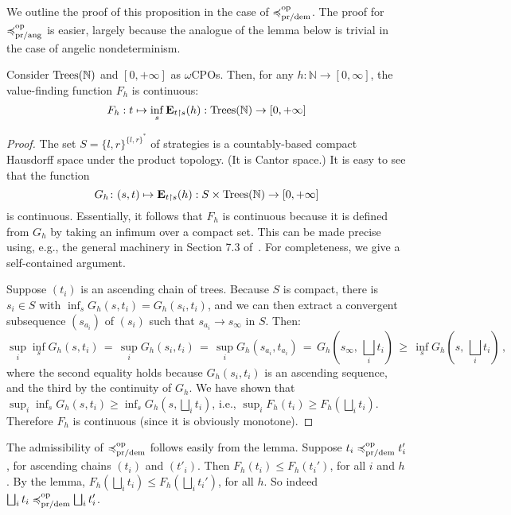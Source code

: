 We outline the proof of this proposition in the case of $\preccurlyeq^{\text{op}}_{\text{pr/dem}}$. The proof for  $\preccurlyeq^{\text{op}}_{\text{pr/ang}}$ is easier, largely because the analogue of the lemma below is trivial in the case of angelic nondeterminism.
\begin{lemma} 
\label{lemma:F-continuous}
Consider $\textnormal{Trees}(\mathbb{N})$ and $[0,+\infty]$ as $\omega$CPOs. Then,
for any $h \colon \mathbb{N} \to [0,\infty]$, 
the value-finding function $F_h$ is continuous:
\[F_h : t \mapsto \inf_s  \mathbf{E}_{t\restriction s} (h) : \textnormal{Trees}(\mathbb{N}) \to [0,+\infty]\]
\end{lemma}
\begin{proof}
The set $S = \{l,r\}^{\{l,r\}^*}$ of strategies is a countably-based compact Hausdorff space under the product topology. (It is Cantor space.)
It is easy to see that  the function 
\[G_h \colon (s,t) \mapsto \mathbf{E}_{t\restriction s} (h) : S \times \textnormal{Trees}(\mathbb{N})  \to [0,+\infty] \]
is continuous.
Essentially, it follows that $F_h$ is continuous because it is defined from $G_h$ by taking an infimum over a compact set. 
This can be made precise using, e.g.,  the general machinery in Section 7.3 of~\cite{AndreaShalk}. For completeness, we give a self-contained argument. 

Suppose $(t_i)$ is an ascending chain of trees.
Because $S$ is compact,  there is $s_i \in S$ with $\inf_s G_h(s,t_i) = G_h(s_i, t_i)$,
and we can then extract a convergent 
subsequence  $(s_{a_i})$ of $(s_i)$ such that $s_{a_i} \rightarrow s_\infty$ in $S$. Then:
\begin{equation*}
                \sup_i \inf_s G_h(s,t_i)
                \, =\, 
                \sup_i G_h(s_i, t_i)
                \, = \,
                \sup_i G_h(s_{a_i}, t_{a_i})
                \, = \,
                G_h(s_\infty, \, \bigsqcup_i t_i)
                \, \geq \,
                \inf_s  G_h(s, \, \bigsqcup_i t_i)\, ,
            \end{equation*}
where the second equality holds because $G_h(s_i, t_i)$ is an ascending sequence, and the third by the continuity of  $G_h$.
We have shown that $ \sup_i  \inf_s G_h(s,t_i) \geq \inf_s  G_h(s, \bigsqcup_i t_i)$, i.e., 
$ \sup_i  F_h(t_i) \geq F_h(\bigsqcup_i t_i)$. 
Therefore $F_h$ is continuous (since it is obviously monotone).
\end{proof}

\noindent
The admissibility of $\preccurlyeq^{\text{op}}_{\text{pr/dem}}$ follows easily from the lemma.
Suppose $t_i \preccurlyeq^{\text{op}}_{\text{pr/dem}} t_i'$, for ascending chains $(t_i)$ and $(t'_i)$.
Then $F_h(t_i) \leq F_h (t_i')$, for all $i$ and $h$. By the lemma, 
 $F_h (\bigsqcup_i t_i) \leq F_h (\bigsqcup_i t_i')$, for all $h$.
So indeed  $\bigsqcup_i t_i \preccurlyeq^{\text{op}}_{\text{pr/dem}} \bigsqcup_i t_i'$.

